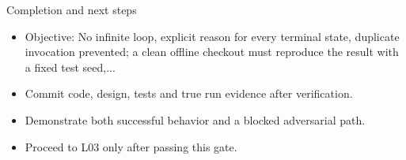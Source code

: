 \documentclass[aspectratio=169,10pt]{beamer}
\begin{document}
\begin{frame}{Completion and next steps}
\small
\begin{itemize}
\item Objective: No infinite loop, explicit reason for every terminal state, duplicate invocation prevented; a clean offline checkout must reproduce the result with a fixed test seed,...
\item Commit code, design, tests and true run evidence after verification.
\item Demonstrate both successful behavior and a blocked adversarial path.
\item Proceed to L03 only after passing this gate.
\end{itemize}

\end{frame}
\end{document}
